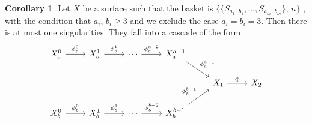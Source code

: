 \documentclass[11pt]{amsbook}
\theoremstyle{definition}
\theoremstyle{definition}
\newtheorem{cor}[thm]{Corollary}
\theoremstyle{definition}
\theoremstyle{definition}
\theoremstyle{definition}
\theoremstyle{definition}
\theoremstyle{definition}
\theoremstyle{definition}
\begin{document}
\begin{cor}\label{doublecurve}
Let $X$ be a surface such that the basket is  $\{ \{ S_{a_1, \, b_1}, \dots , S_{a_m, \, b_m} \}, \, n \}$ , with the condition that $a_i, \, b_i \geq 3$ and we exclude the case $a_i = b_i = 3$. Then there is at most one singularities. They fall into a cascade of the form
\[
\begin{tikzcd}
X_a^0 \arrow[r, "\phi_a^0"] & X_a^1 \arrow[r, "\phi_a^1"] & \cdots \arrow[r, "\phi_a^{a-2}"] & X_a^{a-1} \arrow[rd, "\phi_a^{a-1}"] &                       &     \\
                            &                             &                                 &                                      & X_1 \arrow[r, "\Phi"] & X_2 \\
X_b^0 \arrow[r, "\phi_b^0"] & X_b^1 \arrow[r, "\phi_b^1"] & \cdots \arrow[r, "\phi_b^{b-2}"] & X_b^{b-1} \arrow[ru, "\phi_b^{b-1}"] &                       &    
\end{tikzcd}
\]
\end{cor}
\end{document}
